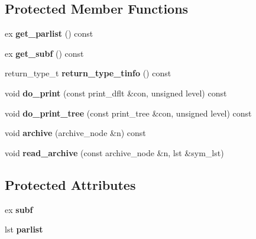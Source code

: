 \subsection*{Protected Member Functions}
\begin{DoxyCompactItemize}
\item 
\mbox{\label{class_moeb_inv_1_1subfigure_a918353b34513df293690b9cc52b054e4}} 
ex {\bfseries get\+\_\+parlist} () const
\item 
\mbox{\label{class_moeb_inv_1_1subfigure_a867136abf548a648d6e2520276e683b3}} 
ex {\bfseries get\+\_\+subf} () const
\item 
\mbox{\label{class_moeb_inv_1_1subfigure_a4ebd74b08b23f3486c4e9946b2126976}} 
return\+\_\+type\+\_\+t {\bfseries return\+\_\+type\+\_\+tinfo} () const
\item 
\mbox{\label{class_moeb_inv_1_1subfigure_a6bff7c7a0c383e99c633a7dd82d24ede}} 
void {\bfseries do\+\_\+print} (const print\+\_\+dflt \&con, unsigned level) const
\item 
\mbox{\label{class_moeb_inv_1_1subfigure_a00ca520915569473c9fde98383feaacb}} 
void {\bfseries do\+\_\+print\+\_\+tree} (const print\+\_\+tree \&con, unsigned level) const
\item 
\mbox{\label{class_moeb_inv_1_1subfigure_ac6df4d0f4fca396760208e88db553878}} 
void {\bfseries archive} (archive\+\_\+node \&n) const
\item 
\mbox{\label{class_moeb_inv_1_1subfigure_a1bbb1181211b89637ae13f6c9b9ca081}} 
void {\bfseries read\+\_\+archive} (const archive\+\_\+node \&n, lst \&sym\+\_\+lst)
\end{DoxyCompactItemize}
\subsection*{Protected Attributes}
\begin{DoxyCompactItemize}
\item 
\mbox{\label{class_moeb_inv_1_1subfigure_abfb9102f879a82bbfe67b73af6f95db7}} 
ex {\bfseries subf}
\item 
\mbox{\label{class_moeb_inv_1_1subfigure_ae1c45cc944264ac922f4a9ea43a82ed5}} 
lst {\bfseries parlist}
\end{DoxyCompactItemize}
